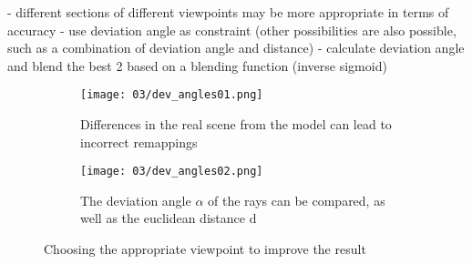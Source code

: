 
- different sections of different viewpoints may be more appropriate in terms of accuracy
- use deviation angle as constraint (other possibilities are also possible, such as a combination of deviation angle and distance)
- calculate deviation angle and blend the best 2 based on a blending function (inverse sigmoid)

\begin{figure}
\centering
    \hfill
    \begin{subfigure}[t]{0.3\textwidth}            
            \centering
            \texttt{[image: 03/dev\_angles01.png]}
            \caption{Differences in the real scene from the model can lead to incorrect remappings}
    \end{subfigure}%
    \hfill
    \begin{subfigure}[t]{0.3\textwidth}
            \centering
            \texttt{[image: 03/dev\_angles02.png]}
            \caption{The deviation angle $\alpha$ of the rays can be compared, as well as the euclidean distance d}
    \end{subfigure}
    \hfill
    \hfill
    \caption[Choosing the appropriate viewpoint for texture lookup]{Choosing the appropriate viewpoint to improve the result} \label{fig:dev_angle}
\end{figure}


